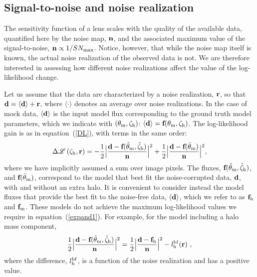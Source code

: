 \documentclass[a4paper, fleqn, usenatbib, useAMS]{mnras}
\def\zh{\zeta_{\rm h}}
\def\DL{\Delta\mathscr{L}}
\begin{document}
\subsection{Signal-to-noise and noise realization}
\label{stonoise}

The sensitivity function of a lens scales with the quality of the
available data, quantified here by the noise map, $\bf n$, 
and the associated maximum value of the signal-to-noise, $\textbf{n}\propto 1/SN_{\rm max}$.
Notice, however, that while the noise map itself is known, the actual noise realization of the observed data is not. 
We are therefore interested in assessing how different noise realizations affect 
the value of the log-likelihood change.

Let us assume that the data are characterized by a noise realization, $\bf r$, so that $\bf d = \langle d\rangle+r$, where $\langle\cdot\rangle$ denotes an average over noise realizations. In the case of mock data, $\langle \bf d\rangle$ is the input model flux corresponding to the ground truth model 
parameters, which we indicate with $(\theta_{\rm m},\zh)$: $\langle {\bf d}\rangle=\textbf{f}(\theta_{\rm m},\zh)$. The log-likelihood gain is as in equation~(\ref{DL}), with terms in the same order:
%
\begin{equation}
\DL \left( \bf\zh, \textbf{r}\right) = - {1\over 2} \Big|  {{{\textbf{d} - \textbf{f}(\hat\theta_{\rm m}, \hat\zh)}\over \bf n}} \Big|^2 + {1\over 2} \Big|  {{{\textbf{d} - \textbf{f}(\bar\theta_{\rm m})}\over \bf n}} \Big|^2,
\label{expand1}
\end{equation}
%
where we have implicitly assumed a sum over image pixels. The fluxes, $\textbf{f}(\hat\theta_{\rm m}, \hat\zh)$, and $\textbf{f}(\bar\theta_{\rm m})$, correspond to the model that best fit the noise-corrupted data, $\bf d$, with and without an extra halo.  
It is convenient to consider instead the 
model fluxes that provide the best fit to the noise-free data, 
$\langle\bf d\rangle$, which we refer to as $\textbf{f}_{\rm h}$ and $\textbf{f}_{\rm m}$. These models do not achieve the maximum log-likelihood values we require in equation~(\ref{expand1}). For example, for the model including a halo mass component, 
%
\begin{equation}
{1\over 2} \Big|  {{{\textbf{d} - \textbf{f}(\hat\theta_{\rm m}, \hat\zh)}\over \bf n}} \Big|^2 = {1\over 2} \Big|  {{{\textbf{d} - \textbf{f}_{\rm h}}\over \bf n}} \Big|^2-l_{\rm h}^{\rm bf}(\textbf{r})\ ,
\label{lbfshift1}
\end{equation}
%
where the difference, $l_{\rm h}^{\rm bf}$, is a function of the noise realization and has a positive value. 
\end{document}
